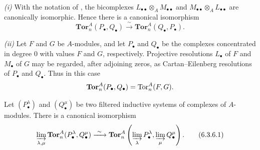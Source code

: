 \begin{remarks}[6.3.5]
\label{III.6.3.5}
\emph{(i)} With the notation of , the bicomplexes
$L_{\bullet\bullet}\otimes_AM_{\bullet\bullet}$ and
$M_{\bullet\bullet}\otimes_AL_{\bullet\bullet}$ are canonically
isomorphic.  Hence there is a canonical isomorphism
\[
  \mathbf{Tor}_n^A(P_\bullet,Q_\bullet)
  \xrightarrow{\ \sim\ }
  \mathbf{Tor}_n^A(Q_\bullet,P_\bullet).
\]

\emph{(ii)} Let $F$ and $G$ be $A$-modules, and let $P_\bullet$
and $Q_\bullet$ be the complexes concentrated in degree $0$ with
values $F$ and $G$, respectively.  Projective resolutions
$L_\bullet$ of $F$ and $M_\bullet$ of $G$ may be regarded, after
adjoining zeros, as Cartan--Eilenberg resolutions of $P_\bullet$
and $Q_\bullet$.  Thus in this case
\[
  \mathbf{Tor}_n^A(P_\bullet,Q_\bullet)=\operatorname{Tor}_n^A(F,G).
\]
\end{remarks}

\begin{proposition}[6.3.6]
\label{III.6.3.6}
Let $(P_\bullet^\lambda)$ and $(Q_\bullet^\mu)$ be two filtered
inductive systems of complexes of $A$-modules.  There is a
canonical isomorphism
\[
  \varinjlim_{\lambda,\mu}
  \mathbf{Tor}_n^A(P_\bullet^\lambda,Q_\bullet^\mu)
  \xrightarrow{\ \sim\ }
  \mathbf{Tor}_n^A\left(
    \varinjlim_\lambda P_\bullet^\lambda,
    \varinjlim_\mu Q_\bullet^\mu
  \right).
  \tag{6.3.6.1}\label{III.6.3.6.1}
\]
\end{proposition}

